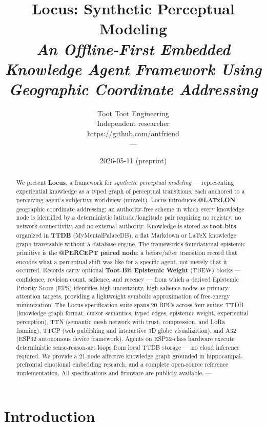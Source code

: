 \documentclass[11pt]{article}
\title{Locus: Synthetic Perceptual Modeling\\[0.4em]
{\normalsize\itshape An Offline-First Embedded Knowledge Agent Framework Using Geographic Coordinate Addressing}}
\author{
Toot Toot Engineering\\
Independent researcher\\
\url{https://github.com/antfriend}\\
---
}
\date{2026-05-11 \quad (preprint)}
\begin{document}
\maketitle

\begin{abstract}
We present \textbf{Locus}, a framework for \emph{synthetic perceptual modeling} --- representing experiential knowledge as a typed graph of perceptual transitions, each anchored to a perceiving agent's subjective worldview (umwelt). Locus introduces \textbf{@LATxLON} geographic coordinate addressing: an authority-free scheme in which every knowledge node is identified by a deterministic latitude/longitude pair requiring no registry, no network connectivity, and no external authority. Knowledge is stored as \textbf{toot-bits} organized in \textbf{TTDB} (MyMentalPalaceDB), a flat Markdown or LaTeX knowledge graph traversable without a database engine. The framework's foundational epistemic primitive is the \textbf{@PERCEPT paired node}: a before/after transition record that encodes what a perceptual shift was like for a specific agent, not merely that it occurred. Records carry optional \textbf{Toot-Bit Epistemic Weight} (TBEW) blocks --- confidence, revision count, salience, and recency --- from which a derived Epistemic Priority Score (EPS) identifies high-uncertainty, high-salience nodes as primary attention targets, providing a lightweight symbolic approximation of free-energy minimization. The Locus specification suite spans 20 RFCs across four suites: TTDB (knowledge graph format, cursor semantics, typed edges, epistemic weight, experiential perception), TTN (semantic mesh network with trust, compression, and LoRa framing), TTCP (web publishing and interactive 3D globe visualization), and A32 (ESP32 autonomous device framework). Agents on ESP32-class hardware execute deterministic sense-reason-act loops from local TTDB storage --- no cloud inference required. We provide a 21-node affective knowledge graph grounded in hippocampal-prefrontal emotional embedding research, and a complete open-source reference implementation. All specifications and firmware are publicly available. ---
\end{abstract}


\section{Introduction}
\end{document}
